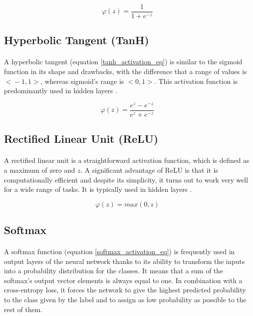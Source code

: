 \begin{equation}
\varphi(z) = \frac{1}{1+e^{-z}}
\label{sigmoid_activation_eq}
\end{equation} 

\subsection{Hyperbolic Tangent (TanH)}
\paragraph{}
A hyperbolic tangent (equation \ref{tanh_activation_eq}) is similar to the sigmoid function in its shape and drawbacks, with the difference that a range of values is $<\!-1, 1\!>$, whereas sigmoid's range is $<\!0, 1\!>$. This activation function is predominantly used in hidden layers \cite{activation_functions_article}.

\begin{equation}
\varphi(z) = \frac{e^z - e^{-z}}{e^z + e^{-z}}
\label{tanh_activation_eq}
\end{equation} 

\subsection{Rectified Linear Unit (ReLU)}
\paragraph{}
A rectified linear unit is a straightforward activation function, which is defined as a maximum of zero and $z$. A significant advantage of ReLU is that it is computationally efficient and despite its simplicity, it turns out to work very well for a wide range of tasks. It is typically used in hidden layers \cite{python_ml_2nd}.

\begin{equation}
\varphi(z) = max(0, z)
\label{relu_activation_eq}
\end{equation} 

\subsection{Softmax}\label{softmax}
\paragraph{}
A softmax function (equation \ref{softmax_activation_eq})\cite{ml_probabilistic} is frequently used in output layers of the neural network thanks to its ability to transform the inputs into a probability distribution for the classes. It means that a sum of the softmax's output vector elements is always equal to one. In combination with a cross-entropy loss, it forces the network to give the highest predicted probability to the class given by the label and to assign as low probability as possible to the rest of them. 


